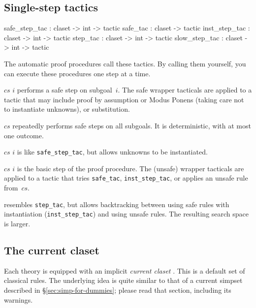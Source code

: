 \subsection{Single-step tactics}
\begin{ttbox} 
safe_step_tac : claset -> int -> tactic
safe_tac      : claset        -> tactic
inst_step_tac : claset -> int -> tactic
step_tac      : claset -> int -> tactic
slow_step_tac : claset -> int -> tactic
\end{ttbox}
The automatic proof procedures call these tactics.  By calling them
yourself, you can execute these procedures one step at a time.
\begin{ttdescription}
\item[\ttindexbold{safe_step_tac} $cs$ $i$] performs a safe step on
  subgoal~$i$.  The safe wrapper tacticals are applied to a tactic that may
  include proof by assumption or Modus Ponens (taking care not to instantiate
  unknowns), or substitution.

\item[\ttindexbold{safe_tac} $cs$] repeatedly performs safe steps on all 
subgoals.  It is deterministic, with at most one outcome.  

\item[\ttindexbold{inst_step_tac} $cs$ $i$] is like \texttt{safe_step_tac},
but allows unknowns to be instantiated.

\item[\ttindexbold{step_tac} $cs$ $i$] is the basic step of the proof
  procedure.  The (unsafe) wrapper tacticals are applied to a tactic that tries
 \texttt{safe_tac}, \texttt{inst_step_tac}, or applies an unsafe rule from~$cs$.

\item[\ttindexbold{slow_step_tac}] 
  resembles \texttt{step_tac}, but allows backtracking between using safe
  rules with instantiation (\texttt{inst_step_tac}) and using unsafe rules.
  The resulting search space is larger.
\end{ttdescription}


\subsection{The current claset}\label{sec:current-claset}

Each theory is equipped with an implicit \emph{current claset}
.  This is a default set of classical
rules.  The underlying idea is quite similar to that of a current
simpset described in \S\ref{sec:simp-for-dummies}; please read that
section, including its warnings.  

